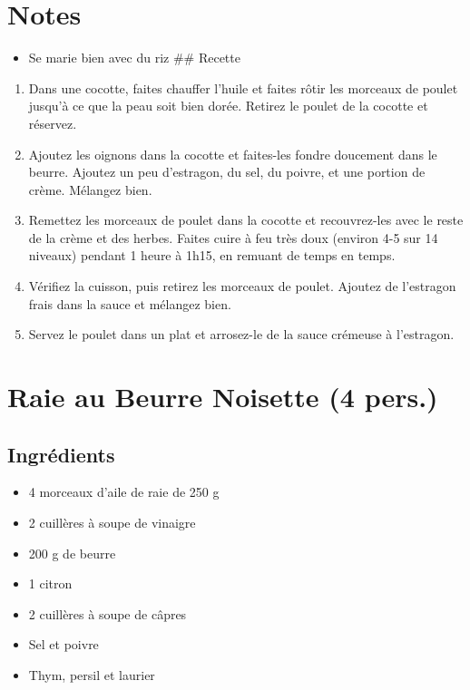 \section{Notes}\label{notes-3}

\begin{itemize}

\item
  Se marie bien avec du riz \#\# Recette
\end{itemize}

\begin{enumerate}
\def\labelenumi{\arabic{enumi}.}

\item
  Dans une cocotte, faites chauffer l'huile et faites rôtir les morceaux
  de poulet jusqu'à ce que la peau soit bien dorée. Retirez le poulet de
  la cocotte et réservez.
\item
  Ajoutez les oignons dans la cocotte et faites-les fondre doucement
  dans le beurre. Ajoutez un peu d'estragon, du sel, du poivre, et une
  portion de crème. Mélangez bien.
\item
  Remettez les morceaux de poulet dans la cocotte et recouvrez-les avec
  le reste de la crème et des herbes. Faites cuire à feu très doux
  (environ 4-5 sur 14 niveaux) pendant 1 heure à 1h15, en remuant de
  temps en temps.
\item
  Vérifiez la cuisson, puis retirez les morceaux de poulet. Ajoutez de
  l'estragon frais dans la sauce et mélangez bien.
\item
  Servez le poulet dans un plat et arrosez-le de la sauce crémeuse à
  l'estragon.
\end{enumerate}

\section{Raie au Beurre Noisette (4
pers.)}\label{raie-au-beurre-noisette-4-pers.}

\subsection{Ingrédients}\label{ingruxe9dients-11}

\begin{itemize}

\item
  4 morceaux d'aile de raie de 250 g
\item
  2 cuillères à soupe de vinaigre
\item
  200 g de beurre
\item
  1 citron
\item
  2 cuillères à soupe de câpres
\item
  Sel et poivre
\item
  Thym, persil et laurier
\end{itemize}

